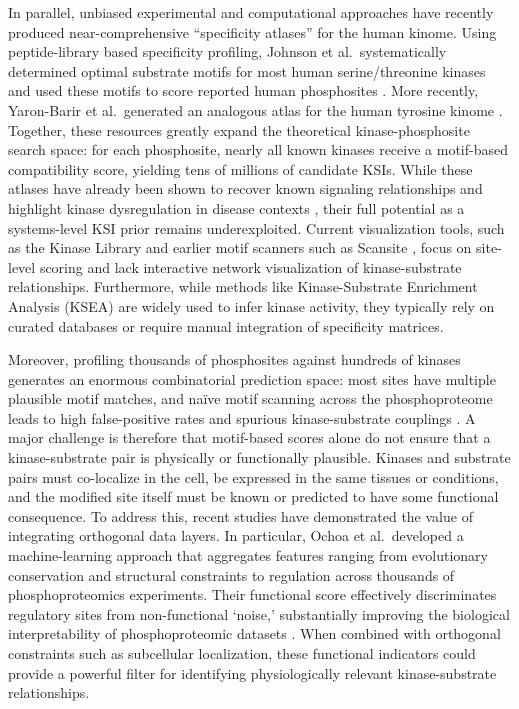 \documentclass[
  number,
  preprint,
  onecolumn]{elsarticle}
\begin{document}
In parallel, unbiased experimental and computational approaches have
recently produced near-comprehensive ``specificity atlases'' for the
human kinome. Using peptide-library based specificity profiling, Johnson
et al.~systematically determined optimal substrate motifs for most human
serine/threonine kinases and used these motifs to score reported human
phosphosites \citep{Johnson2023-ai}. More recently, Yaron-Barir et
al.~generated an analogous atlas for the human tyrosine kinome
\citep{Yaron-Barir2024-lv}. Together, these resources greatly expand the
theoretical kinase-phosphosite search space: for each phosphosite,
nearly all known kinases receive a motif-based compatibility score,
yielding tens of millions of candidate KSIs. While these atlases have
already been shown to recover known signaling relationships and
highlight kinase dysregulation in disease contexts
\citep{Johnson2023-ai, Yaron-Barir2024-lv}, their full potential as a
systems-level KSI prior remains underexploited. Current visualization
tools, such as the Kinase Library \citep{Johnson2023-ai} and earlier
motif scanners such as Scansite \citep{Obenauer2003-fc}, focus on
site-level scoring and lack interactive network visualization of
kinase-substrate relationships. Furthermore, while methods like
Kinase-Substrate Enrichment Analysis (KSEA) are widely used to infer
kinase activity, they typically rely on curated databases or require
manual integration of specificity matrices.

Moreover, profiling thousands of phosphosites against hundreds of
kinases generates an enormous combinatorial prediction space: most sites
have multiple plausible motif matches, and naïve motif scanning across
the phosphoproteome leads to high false-positive rates and spurious
kinase-substrate couplings \citep{Miller2008-ey, Linding2007-rk}. A
major challenge is therefore that motif-based scores alone do not ensure
that a kinase-substrate pair is physically or functionally plausible.
Kinases and substrate pairs must co-localize in the cell, be expressed
in the same tissues or conditions, and the modified site itself must be
known or predicted to have some functional consequence. To address this,
recent studies have demonstrated the value of integrating orthogonal
data layers. In particular, Ochoa et al.~developed a machine-learning
approach that aggregates features ranging from evolutionary conservation
and structural constraints to regulation across thousands of
phosphoproteomics experiments. Their functional score effectively
discriminates regulatory sites from non-functional `noise,'
substantially improving the biological interpretability of
phosphoproteomic datasets \citep{Ochoa2020-og, Higgins2023-jf}. When
combined with orthogonal constraints such as subcellular localization,
these functional indicators could provide a powerful filter for
identifying physiologically relevant kinase-substrate relationships.
\end{document}
